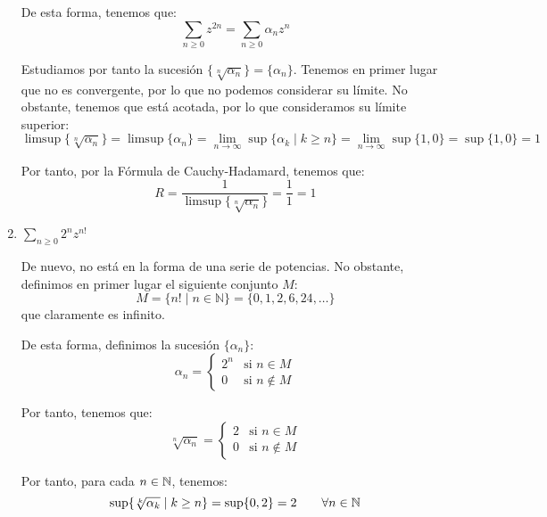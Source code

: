 \begin{ejercicio}
\begin{enumerate}
        De esta forma, tenemos que:
        \begin{equation*}
            \sum_{n \geq 0} z^{2n} = \sum_{n \geq 0} \alpha_nz^n
        \end{equation*}

        Estudiamos por tanto la sucesión $\{\sqrt[n]{\alpha_n}\}=\{\alpha_n\}$. Tenemos en primer lugar que no es convergente, por lo que no podemos considerar su límite. No obstante, tenemos que está acotada, por lo que consideramos su límite superior:
        \begin{equation*}
            \limsup\{\sqrt[n]{\alpha_n}\} = \limsup\{\alpha_n\} = \lim_{n \to \infty} \sup\{\alpha_k\mid k \geq n\} =
            \lim_{n \to \infty} \sup\{1,0\} = \sup\{1,0\} = 1
        \end{equation*}

        Por tanto, por la Fórmula de Cauchy-Hadamard, tenemos que:
        \begin{equation*}
            R = \dfrac{1}{\limsup\{\sqrt[n]{\alpha_n}\}} = \dfrac{1}{1} = 1
        \end{equation*}
        \item $\displaystyle \sum_{n \geq 0} 2^nz^{n!}$
        
        De nuevo, no está en la forma de una serie de potencias. No obstante, definimos en primer lugar el siguiente conjunto $M$:
        \[
            M = \{n! \mid n \in \mathbb{N}\} = \{0,1,2,6,24,\ldots\}
        \]
        que claramente es infinito.

        De esta forma, definimos la sucesión $\{\alpha_n\}$:
        \[
            \alpha_n = \begin{cases}
                2^n & \text{si } n \in M\\
                0 & \text{si } n \notin M
            \end{cases}
        \]

        Por tanto, tenemos que:
        \begin{equation*}
            \sqrt[n]{\alpha_n} = \begin{cases}
                2 & \text{si } n \in M\\
                0 & \text{si } n \notin M
            \end{cases}
        \end{equation*}

        Por tanto, para cada $n\in \mathbb{N}$, tenemos:
        \begin{equation*}
            \sup\{\sqrt[k]{\alpha_k} \mid k \geq n\} = \sup\{0,2\} = 2\qquad \forall n\in \mathbb{N}
        \end{equation*}


\end{enumerate}
\end{ejercicio}
